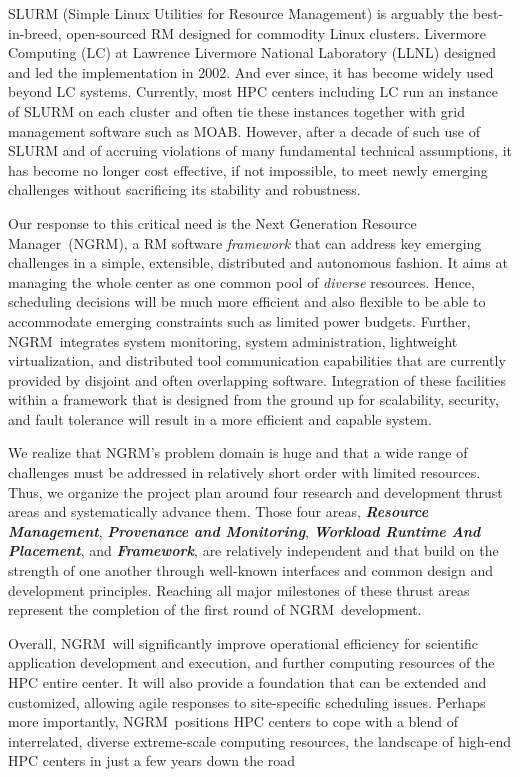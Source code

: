 \documentclass{article}
\newcommand{\ngrm}{NGRM}
\newcommand{\ngrmfull}{Next Generation Resource Manager}
\begin{document}
SLURM\cite{SlurmDesign} (Simple Linux Utilities for Resource Management) is arguably the
best-in-breed, open-sourced RM designed for commodity Linux clusters.
Livermore Computing (LC) at Lawrence Livermore National Laboratory (LLNL)
designed and led the implementation in 2002. And ever since, it has become
widely used beyond LC systems. Currently, most HPC centers including LC
run an instance of SLURM on each cluster and often tie these instances
together with grid management software such as MOAB\cite{MOAB:online}.  However, after a
decade of such use of SLURM and of accruing violations of many fundamental
technical assumptions, it has become no longer cost effective, if not
impossible, to meet newly emerging challenges without sacrificing its
stability and robustness.

Our response to this critical need is the \ngrmfull\ (\ngrm ), a RM software
{\em framework} that can address key emerging challenges 
in a simple, extensible, distributed and autonomous fashion.
It aims at managing the whole center as one common pool of {\em diverse} 
resources. Hence, scheduling decisions 
will be much more efficient and also flexible to be able to 
accommodate emerging constraints such as limited power budgets. 
Further, \ngrm\ integrates
system monitoring, system administration, lightweight
virtualization, and distributed tool communication capabilities
that are currently provided by disjoint and often overlapping software.
Integration of these facilities within a framework that is designed from
the ground up for scalability, security, and fault tolerance will result
in a more efficient and capable system.

We realize that \ngrm's problem domain is huge and that a wide range of challenges 
must be addressed in relatively short order with limited resources. Thus, we 
organize the project plan around four research and development thrust areas 
and systematically advance them.
Those four areas, {\bf{\em Resource Management}}, {\bf{\em Provenance and Monitoring}},
{\bf{\em Workload Runtime And Placement}}, and {\bf{\em Framework}}, are
relatively independent and that build on the strength of one
another through well-known interfaces and common design and development
principles. Reaching all major milestones of these thrust areas represent
the completion of the first round of \ngrm\ development. 

Overall, \ngrm\ will significantly improve operational efficiency for
scientific application development and execution, and further computing
resources of the HPC entire center.  It will also provide
a foundation that can be extended and customized, allowing agile responses
to site-specific scheduling issues. Perhaps more importantly, \ngrm\
positions HPC centers to cope with a blend of interrelated, diverse
extreme-scale computing resources, the landscape of high-end HPC centers
in just a few years down the road
\end{document}
